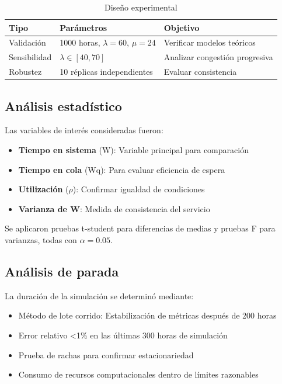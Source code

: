 \documentclass{article}
\begin{document}
\begin{table}[h]
\centering
\caption{Diseño experimental}
\begin{tabular}{|l|l|l|}
\hline
\textbf{Tipo} & \textbf{Parámetros} & \textbf{Objetivo} \\ \hline
Validación & 1000 horas, $\lambda=60$, $\mu=24$ & Verificar modelos teóricos \\ \hline
Sensibilidad & $\lambda \in [40,70]$ & Analizar congestión progresiva \\ \hline
Robustez & 10 réplicas independientes & Evaluar consistencia \\ \hline
\end{tabular}
\label{tab:experimentos}
\end{table}

\subsection{Análisis estadístico}
Las variables de interés consideradas fueron:

\begin{itemize}
\item \textbf{Tiempo en sistema} (W): Variable principal para comparación
\item \textbf{Tiempo en cola} (Wq): Para evaluar eficiencia de espera
\item \textbf{Utilización} ($\rho$): Confirmar igualdad de condiciones
\item \textbf{Varianza de W}: Medida de consistencia del servicio
\end{itemize}

Se aplicaron pruebas t-student para diferencias de medias y pruebas F para varianzas, todas con $\alpha=0.05$.

\subsection{Análisis de parada}
La duración de la simulación se determinó mediante:

\begin{itemize}
\item Método de lote corrido: Estabilización de métricas después de 200 horas
\item Error relativo <1\% en las últimas 300 horas de simulación
\item Prueba de rachas para confirmar estacionariedad
\item Consumo de recursos computacionales dentro de límites razonables
\end{itemize}
\end{document}
